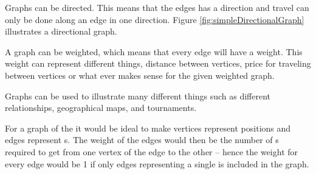 Graphs can be directed. This means that the edges has a direction and travel can only be done along an edge in one direction. Figure \ref{fig:simpleDirectionalGraph} illustrates a directional graph. 

A graph can be weighted, which means that every edge will have a weight.
This weight can represent different things, distance between vertices, price for traveling between vertices or what ever makes sense for the given weighted graph.

\begin{figure}[htb]
	\centering
		\hspace{0.2\textwidth}
		\hspace{0.2\textwidth}
		\caption{}
		\label{fig:exampleGraphs}
\end{figure}

Graphs can be used to illustrate many different things such as different relationships, geographical maps, and tournaments.\cite[pp. 592-593]{Rosen07} 

For a graph of the \rubik{} it would be ideal to make vertices represent positions and edges represent \twist{}s. The weight of the edges would then be the number of \twist{}s required to get from one vertex of the edge to the other -- hence the weight for every edge would be 1 if only edges representing a single \twist{} is included in the graph.

